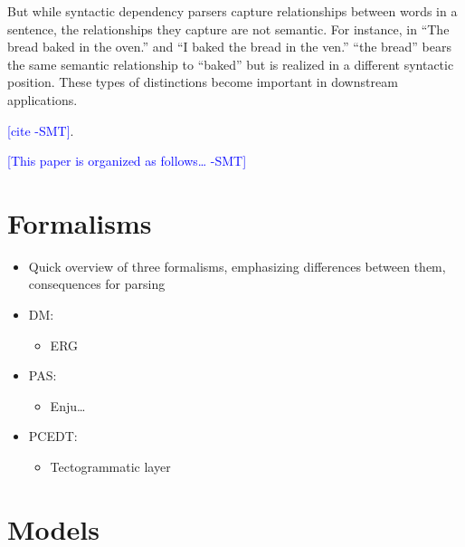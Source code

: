 \documentclass[11pt]{article}
\newcommand{\sam}[1]{\textcolor{blue}{[#1 -SMT]}}
\begin{document}


But while syntactic dependency parsers capture relationships between words in a
sentence, the relationships they capture are not semantic.
For instance, in ``The bread baked in the oven.'' and ``I baked the bread in the
ven.'' ``the bread'' bears the same semantic relationship to ``baked'' but is
realized in a different syntactic position.
These types of distinctions become important in downstream applications.


\sam{cite}.

\sam{This paper is organized as follows\ldots}



\section{Formalisms} \label{s:formalisms}

\begin{itemize}
	\item Quick overview of three formalisms, emphasizing differences between them, consequences for parsing
	\item DM:
	\begin{itemize}
	  \item ERG \cite{flickinger_deepbank_2012}
	\end{itemize}
	\item PAS:
	\begin{itemize}
	  \item Enju\ldots \cite{miyao_corpus_oriented_2004}
	\end{itemize}
	\item PCEDT:
	\begin{itemize}
	  \item Tectogrammatic layer \cite{hajic_building_1998}
	\end{itemize}
\end{itemize}


\section{Models}
\end{document}
